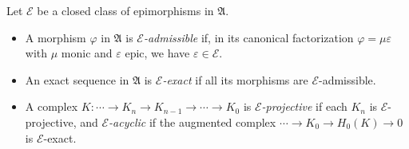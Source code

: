 Let $\mathcal{E}$ be a closed class of epimorphisms in $\mathfrak{A}$.
\begin{itemize}
\item A morphism $\varphi$ in $\mathfrak{A}$ is \emph{$\mathcal{E}$-admissible} if, in its canonical factorization $\varphi = \mu \varepsilon$ with $\mu$ monic and $\varepsilon$ epic, we have $\varepsilon \in \mathcal{E}$.
\item An exact sequence in $\mathfrak{A}$ is \emph{$\mathcal{E}$-exact} if all its morphisms are $\mathcal{E}$-admissible.
\item A complex $K : \cdots \to K_n \to K_{n-1} \to \cdots \to K_0$ is \emph{$\mathcal{E}$-projective} if each $K_n$ is $\mathcal{E}$-projective, and \emph{$\mathcal{E}$-acyclic} if the augmented complex $\cdots \to K_0 \to H_0(K) \to 0$ is $\mathcal{E}$-exact.
\end{itemize}